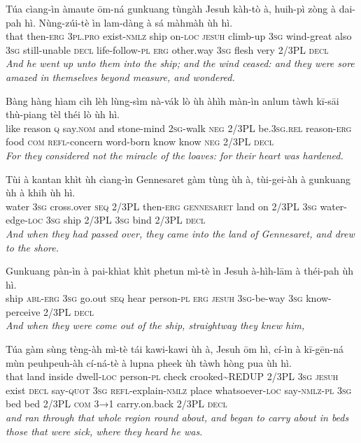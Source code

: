 \documentclass[11pt,a4paper]{article}
\begin{document}
\begin{exe}
\gll Túa cìang-ìn àmaute ōm-ná gunkuang tùngàh Jesuh kàh-tò à, huih-pì zòng à dai-pah hì. Nùng-zúi-tè ìn lam-dàng à sá màhmàh ùh hì. \\
     that then-\textsc{erg} \textsc{3pl}.\textsc{pro} exist-\textsc{nmlz} ship on-\textsc{loc} \textsc{jesuh} climb-up \textsc{3sg} wind-great also \textsc{3sg} still-unable \textsc{decl} life-follow-\textsc{pl} \textsc{erg} other.way \textsc{3sg} flesh very 2/3PL \textsc{decl} \\
\glt \textcolor{kjvcolor}{\textit{And he went up unto them into the ship; and the wind ceased: and they were sore amazed in themselves beyond measure, and wondered.}}

\gll Bàng hàng hìam cìh lèh lùng-sìm nà-vák lò ùh àhìh màn-ìn anlum tàwh kī-sāi thù-piang tèl théi lò ùh hì. \\
     like reason \textsc{q} say.\textsc{nom} and stone-mind \textsc{2sg}-walk \textsc{neg} 2/3PL be.\textsc{3sg}.\textsc{rel} reason-\textsc{erg} food \textsc{com} \textsc{refl}-concern word-born know know \textsc{neg} 2/3PL \textsc{decl} \\
\glt \textcolor{kjvcolor}{\textit{For they considered not the miracle of the loaves: for their heart was hardened.}}

\gll Tùi à kantan khìt ùh cìang-ìn Gennesaret gàm tùng ùh à, tùi-gei-àh à gunkuang ùh à khih ùh hì. \\
     water \textsc{3sg} cross.over \textsc{seq} 2/3PL then-\textsc{erg} \textsc{gennesaret} land on 2/3PL \textsc{3sg} water-edge-\textsc{loc} \textsc{3sg} ship 2/3PL \textsc{3sg} bind 2/3PL \textsc{decl} \\
\glt \textcolor{kjvcolor}{\textit{And when they had passed over, they came into the land of Gennesaret, and drew to the shore.}}

\gll Gunkuang pàn-ìn à pai-khìat khìt phetun mì-tè ìn Jesuh à-hìh-lām à théi-pah ùh hì. \\
     ship \textsc{abl}-\textsc{erg} \textsc{3sg} go.out \textsc{seq} hear person-\textsc{pl} \textsc{erg} \textsc{jesuh} \textsc{3sg}-be-way \textsc{3sg} know-perceive 2/3PL \textsc{decl} \\
\glt \textcolor{kjvcolor}{\textit{And when they were come out of the ship, straightway they knew him,}}

\gll Túa gàm sùng tèng-àh mì-tè tái kawi-kawi ùh à, Jesuh ōm hì, cí-ìn à kī-gēn-ná mùn peuhpeuh-àh cí-ná-tè à lupna pheek ùh tàwh hòng pua ùh hì. \\
     that land inside dwell-\textsc{loc} person-\textsc{pl} check crooked\textasciitilde{}REDUP 2/3PL \textsc{3sg} \textsc{jesuh} exist \textsc{decl} say-\textsc{quot} \textsc{3sg} \textsc{refl}-explain-\textsc{nmlz} place whatsoever-\textsc{loc} say-\textsc{nmlz}-\textsc{pl} \textsc{3sg} bed bed 2/3PL \textsc{com} \textsc{3→1} carry.on.back 2/3PL \textsc{decl} \\
\glt \textcolor{kjvcolor}{\textit{and ran through that whole region round about, and began to carry about in beds those that were sick, where they heard he was.}}


\end{exe}
\end{document}
